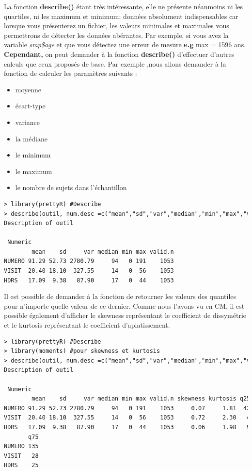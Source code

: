 La fonction \textbf{describe()} étant très intéressante, elle ne présente néanmoins ni les quartiles, ni les maximum et minimum; données absolument indispensables car lorsque vous présenterez un fichier, les valeurs minimales et maximales vous permettrons de détecter les données abérantes. Par exemple, si vous avez la variable \textit{smp\$age} et que vous détectez une erreur de mesure \textbf{e.g} max = 1596 ans.\newline
\textbf{Cependant,} on peut demander à la fonction \textbf{describe()} d'effectuer d'autres calculs que ceux proposés de base. Par exemple ,nous allons demander à la fonction de calculer les paramètres suivants : 
\begin{itemize}
\item moyenne
\item écart-type
\item variance
\item la médiane
\item le minimum
\item le maximum
\item le nombre de sujets dans l'échantillon
\end{itemize}
\begin{lstlisting}[language=html]
> library(prettyR) #Describe
> describe(outil, num.desc =c("mean","sd","var","median","min","max","valid.n"))
Description of outil 

 Numeric 
        mean    sd     var median min max valid.n
NUMERO 91.29 52.73 2780.79     94   0 191    1053
VISIT  20.40 18.10  327.55     14   0  56    1053
HDRS   17.09  9.38   87.90     17   0  44    1053
\end{lstlisting}
Il est possible de demander à la fonction de retourner les valeurs des quantiles pour n'importe quelle valeur de ce dernier.\newline
Comme nous l'avons vu en CM, il est possible également d'afficher le skewness représentant le coefficient de dissymétrie et le kurtosis représentant le coefficient d'aplatissement.
\begin{lstlisting}[language=html]
> library(prettyR) #Describe
> library(moments) #pour skewness et kurtosis
> describe(outil, num.desc =c("mean","sd","var","median","min","max","valid.n","skewness","kurtosis","q25","q75"))
Description of outil 

 Numeric 
        mean    sd     var median min max valid.n skewness kurtosis q25
NUMERO 91.29 52.73 2780.79     94   0 191    1053     0.07     1.81  42
VISIT  20.40 18.10  327.55     14   0  56    1053     0.72     2.30   4
HDRS   17.09  9.38   87.90     17   0  44    1053     0.06     1.98   9
       q75
NUMERO 135
VISIT   28
HDRS    25
\end{lstlisting}
